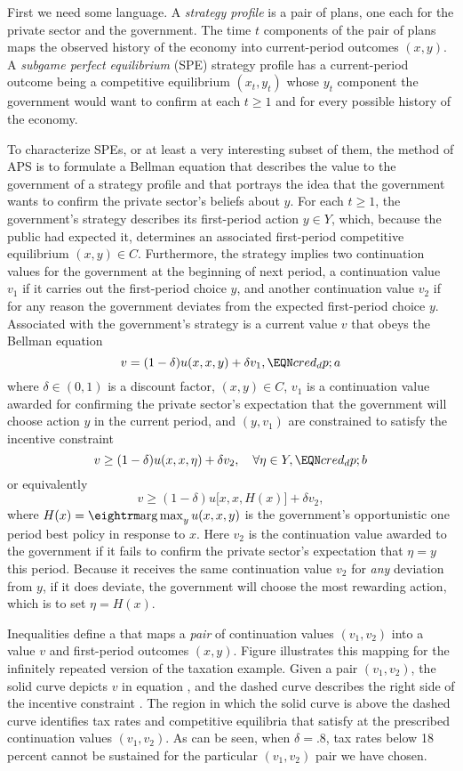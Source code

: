 First we need some language. A {\it strategy profile\/}
 is a pair of  plans, one
each for the private sector and the government.  The time $t$ components of the pair of plans maps the observed
history of the economy into current-period
outcomes $(x,y)$.  A {\it subgame perfect
equilibrium\/} (SPE)
strategy  profile  has a current-period outcome being
a competitive equilibrium
$(x_t,y_t)$ whose $y_t$ component
  the government would want
to confirm
at each $t \geq 1$ and for every
possible history of the economy.

To characterize  SPEs, or at least a very interesting subset of them,
the method of APS is to formulate a Bellman
equation that describes the value to the government of a strategy profile
and that portrays the idea that
the government wants to confirm the
private sector's beliefs about $y$.
 For each $t \geq 1$, the
government's strategy describes its
first-period action $y\in Y$, which,  because the public had expected
it,  determines
an associated first-period competitive equilibrium
$(x,y) \in C$. Furthermore,
the strategy implies two continuation values
 for the government at the beginning of next period,  a
continuation value $v_1$
 if it carries out the first-period choice $y$,
and another continuation value
$v_2$  if for any reason the government
deviates from the expected first-period choice
$y$.
Associated with the government's strategy is
a current value $v$ that obeys the Bellman equation
$$ v = (1-\delta) u(x,x,y) + \delta v_1 ,\EQN cred_dp;a   $$
where $\delta \in (0,1)$ is a discount factor, $(x,y) \in C$, $v_1$ is a continuation value
awarded for confirming the private sector's expectation that the government will choose action $y$ in the current period,  and
 $(y,v_1)$  are constrained to satisfy
the incentive constraint
$$v \geq (1-\delta) u(x,x,\eta) +
 \delta v_2 , \quad
   \forall \eta \in Y, \EQN cred_dp;b  $$
or equivalently
$$v \geq (1-\delta) u\bigl[x,x,H(x)\bigr] +
 \delta v_2 ,$$
where  $H(x) = \argmax_y u(x,x,y)$ is the government's opportunistic one period best policy in response
to $x$.
Here $v_2$ is the continuation value awarded to the government if it fails to confirm
the private sector's expectation that $\eta = y$ this period.
Because it receives the same continuation
value $v_2$ for {\it any\/} deviation from $y$, if it
does deviate, the government  will  choose the most rewarding action, which
is to set $\eta = H(x)$.

  Inequalities  define a  that
maps a {\it pair\/} of continuation values $(v_1,v_2)$ into a value $v$ and
first-period outcomes $(x,y)$. %
Figure  illustrates this
mapping for the infinitely repeated version of the taxation
example. Given a pair $(v_1,v_2)$, the solid curve depicts $v$
in equation , and the dashed curve describes the right
side of the incentive constraint . The region in which
the solid
curve is above the dashed curve  identifies
tax rates and competitive equilibria that
satisfy
 at the prescribed continuation values $(v_1,v_2)$. As
can be seen, when $\delta =.8$,
 tax rates below 18 percent cannot be sustained
for the particular $(v_1, v_2)$ pair we have chosen.

